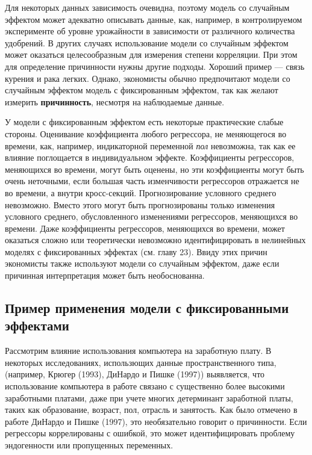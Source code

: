 Для некоторых данных зависимость очевидна, поэтому модель со случайным эффектом может адекватно описывать данные, как, например, в контролируемом эксперименте об уровне урожайности в зависимости от различного количества удобрений. В других случаях использование модели со случайным эффектом может оказаться целесообразным для измерения степени корреляции.  При этом для определение причинности нужны другие подходы. Хороший пример --- связь курения и рака легких. Однако, экономисты обычно предпочитают модели со случайным эффектом модель с фиксированным эффектом, так как желают измерить \textbf{причинность}, несмотря на наблюдаемые данные.

У модели с фиксированным эффектом есть некоторые практические слабые стороны. Оценивание коэффициента любого регрессора, не меняющегося во времени, как, например, индикаторной переменной {\it пол} невозможна, так как ее влияние поглощается в индивидуальном эффекте. Коэффициенты регрессоров, меняющихся во времени, могут быть оценены, но эти коэффициенты могут быть очень неточными, если большая часть изменчивости регрессоров отражается не во времени, а  внутри кросс-секций. Прогнозирование условного среднего невозможно. Вместо этого могут быть прогнозированы только изменения условного среднего, обусловленного изменениями регрессоров, меняющихся во времени. Даже коэффициенты регрессоров, меняющихся во времени, может оказаться сложно или теоретически невозможно идентифицировать в нелинейных моделях с фиксированных эффектах (см. главу 23).  Ввиду этих причин экономисты также используют модели со случайным эффектом, даже если причинная интерпретация может быть необоснованна.

\subsection{Пример применения модели с фиксированными эффектами}

Рассмотрим влияние использования компьютера на заработную плату.  В некоторых исследованиях, использющих данные пространственного типа, (например, Крюгер (1993), ДиНардо и Пишке (1997)) выявляется, что использование компьютера в работе связано с существенно более высокими заработными платами, даже при учете многих детерминант заработной платы, таких как образование, возраст, пол, отрасль и занятость. Как было отмечено в работе ДиНардо и Пишке (1997), это необязательно говорит о причинности. Если регрессоры коррелированы с ошибкой, это может идентифицировать проблему эндогенности или пропущенных переменных.


